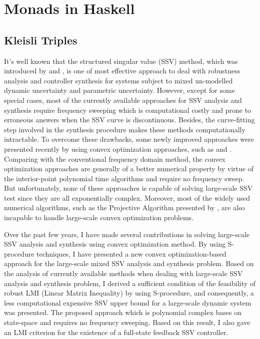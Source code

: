 \documentclass{article}
\begin{document}
\appendix
\section{Monads in Haskell}
\subsection{Kleisli Triples}

It's well known that the structured singular value (SSV) method,
which was introduced by {\citet{PBC91}} and {\citet{AS10}},
is one of most effective approach to deal with robustness analysis and controller synthesis for systems
subject to mixed un-modelled dynamic uncertainty and parametric uncertainty.
However, except for some special cases, most of the currently available approaches for SSV analysis and synthesis require
frequency sweeping which is computational costly and prone to erroneous answers
when the SSV curve is discontinuous.
Besides, the curve-fitting step involved in the synthesis procedure makes these methods computationally intractable.
To overcome these drawbacks, some newly improved approaches were presented recently by using convex optimization approaches,
such as {\citep{BirddeMoor96:Algebra}} and {\citep{AV12}}.
Comparing with the conventional frequency domain method,
the convex optimization approaches are generally of a better numerical property
by virtue of the interior-point polynomial time algorithms{\citep{AM75}} and require no frequency sweep.
But unfortunately, none of these approaches is capable of solving large-scale SSV test
since they are all exponentially complex.
Moreover, most of the widely used numerical algorithms,
such as the Projective Algorithm presented by {\citet{MLS98}},
are also incapable to handle large-scale convex optimization problems{\citet{WRFC09}}.

Over the past few years, I have made several contributions in solving large-scale SSV analysis and synthesis
using convex optimization method.
By using S-procedure techniques, I have presented a new convex optimization-based
approach for the large-scale mixed SSV analysis and synthesis problem.
Based on the analysis of currently available methods when dealing with large-scale SSV analysis and synthesis problem,
I derived a sufficient condition of the feasibility of robust LMI (Linear Matrix Inequality)
by using S-procedure, and consequently, a less computational expensive SSV upper bound for
a large-scale dynamic system was presented.
The proposed approach {\citep{BGM15}} which is polynomial complex bases on state-space and requires no frequency sweeping{\citep{MEG76}}.
Based on this result, I also gave an LMI criterion for the existence of a full-state feedback SSV controller{\citep{RDE85}}.
\end{document}
